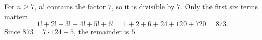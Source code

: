 For $n\ge7$, $n!$ contains the factor $7$, so it is divisible by $7$. Only the first six terms matter:
\[
1!+2!+3!+4!+5!+6!=1+2+6+24+120+720=873 .
\]
Since $873=7\cdot124+5$, the remainder is $\boxed{5}$.

